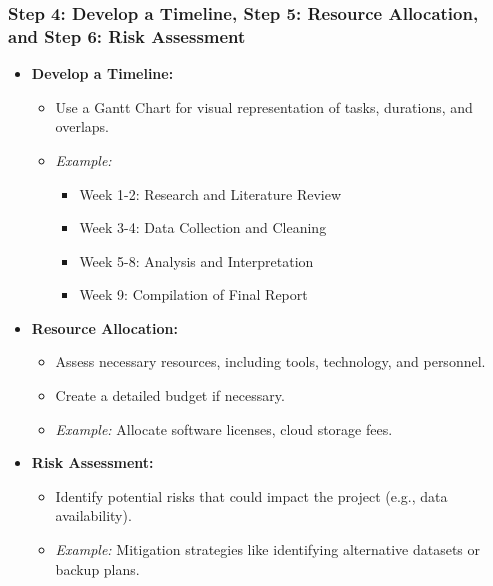 \documentclass[aspectratio=169]{beamer}
\begin{document}
\begin{frame}[fragile]
    \frametitle{Step 4: Develop a Timeline, Step 5: Resource Allocation, and Step 6: Risk Assessment}
    \begin{itemize}
        \item \textbf{Develop a Timeline:}
        \begin{itemize}
            \item Use a Gantt Chart for visual representation of tasks, durations, and overlaps.
            \item \textit{Example:}
            \begin{itemize}
                \item Week 1-2: Research and Literature Review
                \item Week 3-4: Data Collection and Cleaning
                \item Week 5-8: Analysis and Interpretation
                \item Week 9: Compilation of Final Report
            \end{itemize}
        \end{itemize}
        
        \item \textbf{Resource Allocation:}
        \begin{itemize}
            \item Assess necessary resources, including tools, technology, and personnel.
            \item Create a detailed budget if necessary.
            \item \textit{Example:} Allocate software licenses, cloud storage fees.
        \end{itemize}
        
        \item \textbf{Risk Assessment:}
        \begin{itemize}
            \item Identify potential risks that could impact the project (e.g., data availability).
            \item \textit{Example:} Mitigation strategies like identifying alternative datasets or backup plans.
        \end{itemize}
    \end{itemize}
\end{frame}
\end{document}
